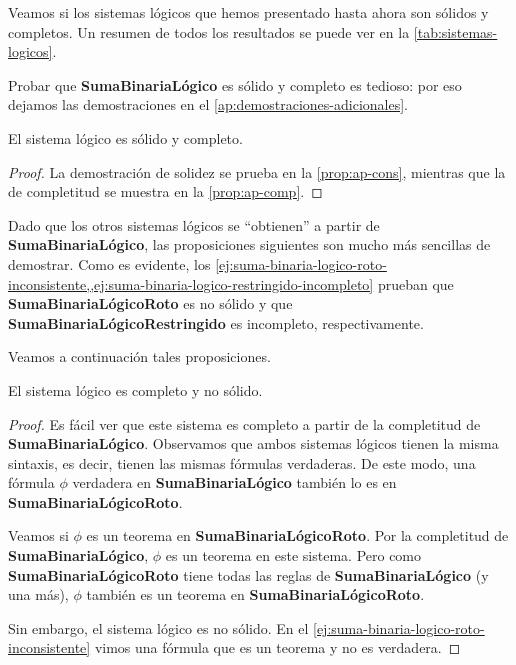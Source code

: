 Veamos si los sistemas lógicos que hemos presentado hasta ahora son sólidos y completos. Un resumen de todos los resultados se puede ver en la \cref{tab:sistemas-logicos}.

Probar que \textbf{SumaBinariaLógico} es sólido y completo es tedioso: por eso dejamos las demostraciones en el \cref{ap:demostraciones-adicionales}.

\begin{proposicion}
El sistema lógico  es sólido y completo.
\end{proposicion}
\begin{proof}
La demostración de solidez se prueba en la \cref{prop:ap-cons}, mientras que la de completitud se muestra en la \cref{prop:ap-comp}.
\end{proof}

Dado que los otros sistemas lógicos se ``obtienen'' a partir de \textbf{SumaBinariaLógico}, las proposiciones siguientes son mucho más sencillas de demostrar. Como es evidente, los \cref{ej:suma-binaria-logico-roto-inconsistente,,ej:suma-binaria-logico-restringido-incompleto} prueban que \textbf{SumaBinariaLógicoRoto} es no sólido y que \textbf{SumaBinariaLógicoRestringido} es incompleto, respectivamente.

Veamos a continuación tales proposiciones.

\begin{proposicion}
El sistema lógico  es completo y no sólido.
\end{proposicion}
\begin{proof}
Es fácil ver que este sistema es completo a partir de la completitud de \textbf{SumaBinariaLógico}. Observamos que ambos sistemas lógicos tienen la misma sintaxis, es decir, tienen las mismas fórmulas verdaderas. De este modo, una fórmula $\phi$ verdadera en \textbf{SumaBinariaLógico} también lo es en \textbf{SumaBinariaLógicoRoto}.

Veamos si $\phi$ es un teorema en \textbf{SumaBinariaLógicoRoto}. Por la completitud de \textbf{SumaBinariaLógico}, $\phi$ es un teorema en este sistema. Pero como \textbf{SumaBinariaLógicoRoto} tiene todas las reglas de \textbf{SumaBinariaLógico} (y una más), $\phi$ también es un teorema en \textbf{SumaBinariaLógicoRoto}.

Sin embargo, el sistema lógico es no sólido. En el \cref{ej:suma-binaria-logico-roto-inconsistente} vimos una fórmula que es un teorema y no es verdadera.
\end{proof}

